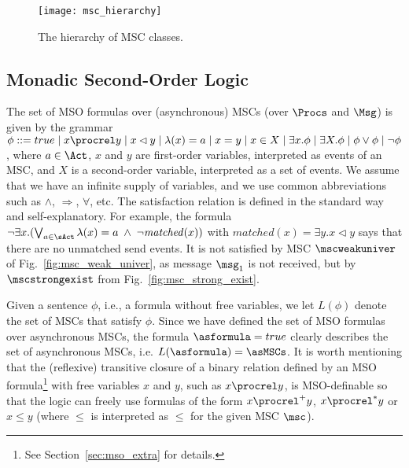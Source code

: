 \begin{figure}[h]
	\centering
	\texttt{[image: msc\_hierarchy]}
	\caption{The hierarchy of MSC classes.}
\end{figure}

\subsection{Monadic Second-Order Logic}

The set of MSO formulas over (asynchronous) MSCs (over $\Procs$ and $\Msg$) is given by the grammar
$
\phi ::= true \mid x \procrel y \mid x \lhd y \mid \lambda(x) = a \mid x = y \mid x \in X \mid \exists x.\phi \mid \exists X.\phi \mid \phi \vee \phi \mid \neg \phi
$,
where $a \in \Act$, $x$ and $y$ are first-order variables, interpreted as
events of an MSC, and $X$ is a second-order variable, interpreted
as a set of events. We assume that we have an infinite supply of variables,
and we use common abbreviations such as $\wedge$, $\Rightarrow$, $\forall$, etc.
The satisfaction relation is defined in the standard way and self-explanatory.
For example, the formula $\neg\exists x.(\bigvee_{a \in \sAct} \lambda(x) = a \;\wedge\; \neg \mathit{matched}(x))$
with $\mathit{matched}(x) = \exists y.x \lhd y$
says that there are no unmatched send events.
It is not satisfied by  MSC $\mscweakuniver$
of Fig.~\ref{fig:msc_weak_univer},
as message $\msg_1$ is not received,
but by $\mscstrongexist$ from Fig.~\ref{fig:msc_strong_exist}.

Given a sentence $\phi$, i.e., a formula without free variables,
we let $L(\phi)$ denote the set of MSCs that satisfy $\phi$. Since we have defined the set of MSO formulas over asynchronous MSCs, the formula $\asformula = true$ clearly describes the set of asynchronous MSCs, i.e. $L(\asformula) = \asMSCs$. It is worth mentioning that the (reflexive) transitive closure of a binary relation defined by an MSO formula\footnote{See Section~\ref{sec:mso_extra} for details.} with free variables $x$ and $y$, such as $x \procrel y$, is MSO-definable so that the logic can freely use formulas of the form $x \procrel^+ y$, $x \procrel^* y$ or $x \le y$ (where $\le$ is interpreted as $\le$ for the given MSC $\msc$).

